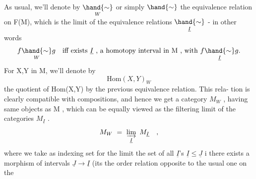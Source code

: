As usual, we'll denote by $\underset{W}{\hand{\sim}}$ or simply $\hand{\sim}$ the equivalence relation
on F(M), which is the limit  of the equivalence relations $\underset{\underline{I}}{\hand{\sim}}$ - in
other words
\[ f\underset{W}{\hand{\sim}}g \quad \text{iff exists } \underline{I}\text{ , a homotopy interval in M , with } f\underset{\underline{I}}{\hand{\sim}}g. \]
For X,Y in M, we'll denote by 
\[ \mathrm{Hom}(X,Y)_W \]
the quotient of Hom(X,Y) by the previous equivalence relation. This rela-%
tion is clearly compatible with compositions, and hence we get a category
$M_W$ , having same objects as M , which can be equally viewed as the 
filtering limit of the categories $M_{\underline{I}}$ .
\[ M_W \ = \ \varinjlim_{\underline{I}} \ M_{\underline{I}} \quad , \]
where we   take as indexing set for the limit the  set of all $\underline{I}$'s\hand{,}
  $\underline{I}\leqslant\underline{J}$ i there exists a morphism of
intervals $\underline{J}\to\underline{I}$ (its the order relation opposite to the usual one on the

